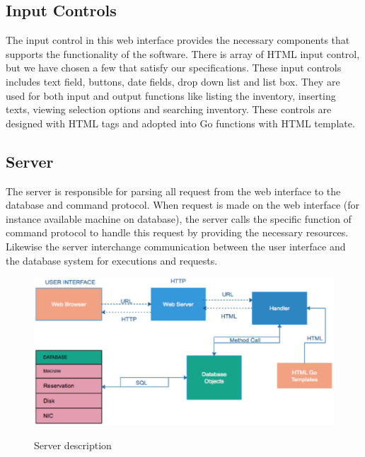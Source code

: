 \subsection*{Input Controls}
The input control in this web interface provides the necessary components that supports the functionality of the software. There is array of HTML input control, but we have chosen a few that satisfy our specifications. These input controls includes text field, buttons, date fields, drop down list and list box. They are used for both input and output functions like listing the inventory, inserting texts, viewing selection options and searching inventory. These controls are designed with HTML tags and adopted into Go functions with HTML template.

\subsection{Server}
The server is responsible for parsing all request from the web interface to the database and command protocol. When request is made on the web interface (for instance available machine on database), the server calls the  specific function of command protocol to handle this request by providing the necessary resources. Likewise the server interchange communication between the user interface and the database system for executions and requests. 

\begin{figure}[ht]
\includegraphics[width = \linewidth]{Design.eps}
\label{fig:Web Inteerface} 
\caption{Server description}
\end{figure}

